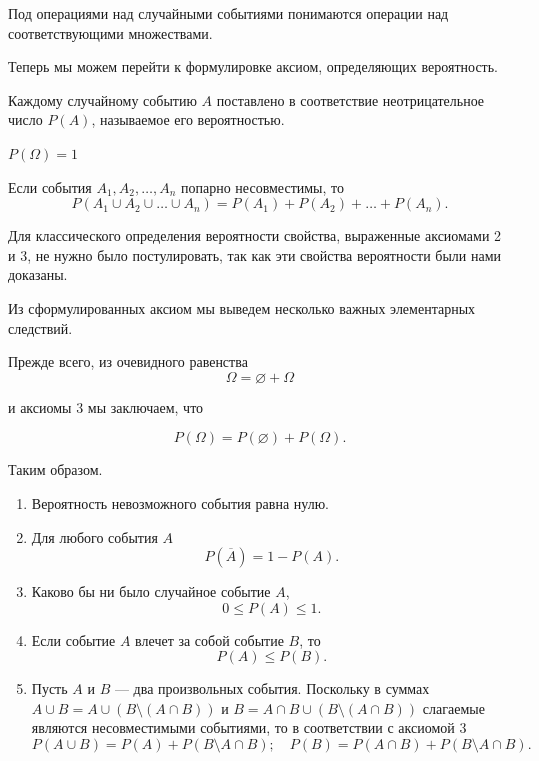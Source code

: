 Под операциями над случайными событиями понимаются операции над соответствующими множествами. 

Теперь мы можем перейти к формулировке аксиом, определяющих вероятность.
\begin{axiome} 
Каждому случайному событию $A$ поставлено в соответствие неотрицательное число $P(A)$, называемое его вероятностью.
\end{axiome}
\begin{axiome} 
$P(\Omega) = 1$
\end{axiome}
\begin{axiome}[сложения] 
Если события $A_1,A_2, \ldots, A_n$ попарно несовместимы, то 
$$
P(A_1 \cup A_2 \cup \ldots \cup A_n) = P(A_1) + P(A_2) + \ldots + P(A_n).
$$
\end{axiome}
Для классического определения вероятности свойства, выраженные аксиомами 2 и 3, не нужно было постулировать, так как эти свойства вероятности были нами доказаны.

Из сформулированных аксиом мы выведем несколько важных элементарных следствий.

Прежде всего, из очевидного равенства
$$
\Omega = \varnothing + \Omega
$$

и аксиомы 3 мы заключаем, что

$$
P(\Omega) = P(\varnothing) + P(\Omega).
$$

Таким образом.
\begin{enumerate}
\item
Вероятность невозможного события равна нулю.
\item	
Для любого события $A$
$$
P(\overline{A}) = 1 - P(A).
$$
\item
Каково бы ни было случайное событие $A$,
$$
0 \le P(A) \le 1.
$$
\item
Если событие $A$ влечет за собой событие $B$, то
$$
P(A) \le P(B).
$$
\item
Пусть $A$ и $B$ --- два произвольных события. Поскольку в суммах $A \cup B = A \cup (B \setminus (A\cap B))$ и $B = A\cap B \cup (B \setminus (A\cap B))$ слагаемые являются несовместимыми событиями, то в соответствии с аксиомой 3
$$
P(A \cup B) = P(A) + P(B \setminus A\cap B);\quad P(B) = P(A\cap B) + P(B \setminus A\cap B).
$$
\end{enumerate}


